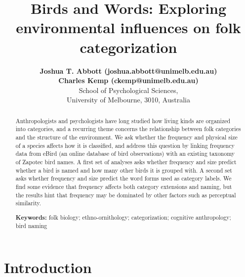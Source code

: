 \documentclass[10pt,letterpaper]{article}
\title{Birds and Words: Exploring environmental influences on folk categorization}
\author{{\large \bf Joshua T. Abbott (joshua.abbott@unimelb.edu.au)} \\
 {\large \bf Charles Kemp (ckemp@unimelb.edu.au)} \\
  School of Psychological Sciences,  \\
  University of Melbourne, 3010, Australia}
\begin{document}
\maketitle


\begin{abstract}

Anthropologists and psychologists have long studied how living kinds are organized into categories, and a recurring theme concerns the relationship between folk categories and the structure of the environment.  We ask whether the frequency and physical size of a species affects how it is classified, and address this question by linking frequency data from eBird (an online database of bird observations) with an existing taxonomy of Zapotec bird names.  A first set of analyses asks whether frequency and size predict whether a bird is named and how many other birds it is grouped with. A second set asks whether frequency and size predict the word forms used as category labels.  We find some evidence that frequency affects both category extensions and naming, but the results hint that frequency may be dominated by other factors such as perceptual similarity.  


\textbf{Keywords:} 
folk biology; ethno-ornithology; categorization; cognitive anthropology; bird naming
\end{abstract}


\section{Introduction}
\end{document}

